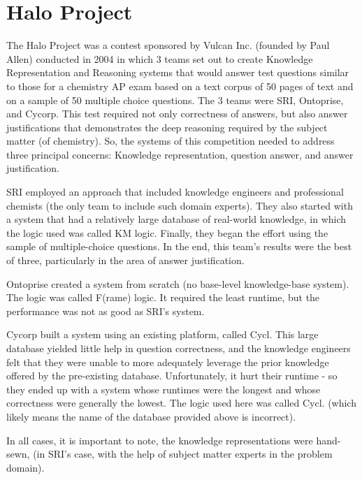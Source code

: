 \section{Halo Project}

The Halo Project \cite{friedland2004project} was a contest sponsored by Vulcan Inc. (founded by
Paul Allen) conducted in 2004 in which 3 teams set out to create 
Knowledge Representation and Reasoning systems
that would answer test questions similar to those for a chemistry AP exam
based on a text corpus of 50 pages of text and on a sample of 50 multiple
choice questions.  The 3 teams were SRI, Ontoprise, and Cycorp.  This test
required not only correctness of answers, but also answer justifications
that demonstrates the deep reasoning required by the subject matter (of 
chemistry).  So, the systems of this competition needed to address three principal
concerns:  Knowledge representation, question answer, and answer justification. 

SRI employed an approach that included knowledge engineers and 
professional chemists (the only team to include such domain experts).
They also started with a system that had a relatively large database
of real-world knowledge, in which the logic used was called KM logic.
Finally, they began the effort using the 
sample of multiple-choice questions.  In the end, this team's results
were the best of three, particularly in the area of answer justification.

Ontoprise created a system from scratch (no base-level knowledge-base system).
The logic was called F(rame) logic.  It required the least runtime, but 
the performance was not as good as SRI's system.

Cycorp built a system using an existing platform, called Cycl.  This large
database yielded little help in question correctness, and the knowledge
engineers felt that they were unable to more adequately leverage the 
prior knowledge offered by the pre-existing database.  Unfortunately, it 
hurt their runtime - so they ended up with a system whose runtimes were
the longest and whose correctness were generally the lowest.  The logic
used here was called Cycl.  (which likely means the name of the database
provided above is incorrect).

In all cases, it is important to note, the knowledge representations were 
hand-sewn, (in SRI's case, with the help of subject matter experts in the
problem domain).

